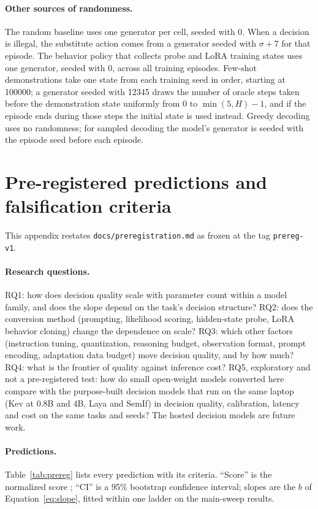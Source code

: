 \paragraph{Other sources of randomness.}
The random baseline uses one generator per cell, seeded with 0. When a decision is illegal, the substitute action comes from a generator seeded with $\sigma+7$ for that episode. The behavior policy that collects probe and LoRA training states uses one generator, seeded with 0, across all training episodes. Few-shot demonstrations take one state from each training seed in order, starting at 100000; a generator seeded with 12345 draws the number of oracle steps taken before the demonstration state uniformly from 0 to $\min(5,H)-1$, and if the episode ends during those steps the initial state is used instead. Greedy decoding uses no randomness; for sampled decoding the model's generator is seeded with the episode seed before each episode.

\section{Pre-registered predictions and falsification criteria}
\label{app:prereg}

This appendix restates \texttt{docs/preregistration.md} as frozen at the tag \texttt{prereg-v1}. 

\paragraph{Research questions.}
RQ1: how does decision quality scale with parameter count within a model family, and does the slope depend on the task's decision structure? RQ2: does the conversion method (prompting, likelihood scoring, hidden-state probe, LoRA behavior cloning) change the dependence on scale? RQ3: which other factors (instruction tuning, quantization, reasoning budget, observation format, prompt encoding, adaptation data budget) move decision quality, and by how much? RQ4: what is the frontier of quality against inference cost? RQ5, exploratory and not a pre-registered test: how do small open-weight models converted here compare with the purpose-built decision models that run on the same laptop (Kev at 0.8B and 4B, Laya and SemIf) in decision quality, calibration, latency and cost on the same tasks and seeds? The hosted decision models are future work.

\paragraph{Predictions.}
Table~\ref{tab:prereg} lists every prediction with its criteria. ``Score'' is the normalized score \norm{}; ``CI'' is a 95\% bootstrap confidence interval; slopes are the $b$ of Equation~\eqref{eq:slope}, fitted within one ladder on the main-sweep results.

